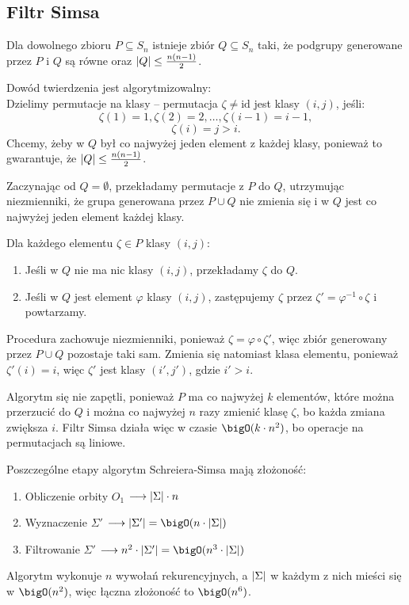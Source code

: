 \newpage
\subsection{Filtr Simsa}
\begin{theorem}
    Dla dowolnego zbioru \( P \subseteq S_n \) istnieje zbiór \( Q \subseteq S_n \) taki, że podgrupy generowane przez \(P\) i \(Q\) są równe oraz \( \left\lvert Q\right\rvert \leq \frac{n(n-1)}{2} \).
\end{theorem}
Dowód twierdzenia jest algorytmizowalny: \\
Dzielimy permutacje na klasy -- permutacja \(\zeta \neq \text{id}\) jest klasy \((i, j)\), jeśli:
\[
    \zeta(1) = 1, \zeta(2) = 2, \ldots, \zeta(i - 1) = i - 1,
\]
\[
    \zeta(i) = j > i.
\]
Chcemy, żeby w \( Q \) był co najwyżej jeden element z każdej klasy, ponieważ to gwarantuje, że \( \left\lvert Q\right\rvert \leq \frac{n(n-1)}{2} \).

Zaczynając od \(Q = \emptyset\), przekładamy permutacje z \(P\) do \(Q\), utrzymując niezmienniki, że grupa generowana przez \( P \cup Q \) nie zmienia się i w \( Q \) jest co najwyżej jeden element każdej klasy.

Dla każdego elementu \(\zeta \in P\) klasy \((i, j)\):
\begin{enumerate}
    \item Jeśli w \(Q\) nie ma nic klasy \((i, j)\), przekładamy \(\zeta\) do \(Q\).
    \item Jeśli w \(Q\) jest element \(\varphi\) klasy \((i, j)\), zastępujemy \(\zeta\) przez \(\zeta' = \varphi^{-1} \circ \zeta\) i powtarzamy.
\end{enumerate}
Procedura zachowuje niezmienniki, ponieważ \(\zeta = \varphi \circ \zeta'\), więc zbiór generowany przez \(P \cup Q\) pozostaje taki sam.
Zmienia się natomiast klasa elementu, ponieważ \(\zeta'(i) = i\), więc \(\zeta'\) jest klasy \((i', j')\), gdzie \(i' > i\).

Algorytm się nie zapętli, ponieważ \( P \) ma co najwyżej \(k\) elementów, które można przerzucić do \(Q\) i można co najwyżej \( n \) razy zmienić klasę \( \zeta \), bo każda zmiana zwiększa \( i \).
Filtr Simsa działa więc w czasie \(\bigO(k \cdot n^2)\), bo operacje na permutacjach są liniowe.

Poszczególne etapy algorytm Schreiera-Simsa mają złożoność:
\begin{enumerate}
    \item Obliczenie orbity \(O_1\) \( \longrightarrow \left\lvert\Sigma\right\rvert \cdot n \)
    \item Wyznaczenie \(\Sigma'\) \( \longrightarrow \abs{\Sigma'} = \bigO(n \cdot \abs{\Sigma})\)
    \item Filtrowanie \(\Sigma'\) \( \longrightarrow n^2 \cdot \abs{\Sigma'} = \bigO(n^3 \cdot \abs{\Sigma})\)
\end{enumerate}
Algorytm wykonuje \( n \) wywołań rekurencyjnych, a \( \left\lvert\Sigma\right\rvert \) w każdym z nich mieści się w \( \bigO(n^2) \), więc łączna złożoność to \( \bigO(n^6) \).